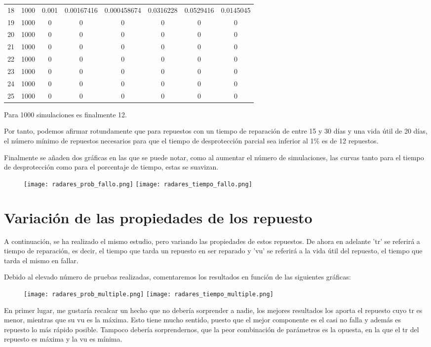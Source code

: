 \begin{table}[h]
{\begin{tabular}{|c|c|c|c|c|c|c|c|}
18 & 1000 & 0.001 & 0.00167416 & 0.000458674 & 0.0316228 & 0.0529416 & 0.0145045 \\
19 & 1000 & 0 & 0 & 0 & 0 & 0 & 0 \\
20 & 1000 & 0 & 0 & 0 & 0 & 0 & 0 \\
21 & 1000 & 0 & 0 & 0 & 0 & 0 & 0 \\
22 & 1000 & 0 & 0 & 0 & 0 & 0 & 0 \\
23 & 1000 & 0 & 0 & 0 & 0 & 0 & 0 \\
24 & 1000 & 0 & 0 & 0 & 0 & 0 & 0 \\
25 & 1000 & 0 & 0 & 0 & 0 & 0 & 0 \\ \hline
\end{tabular}%
}
\end{table}

Para 1000 simulaciones es finalmente 12.

Por tanto, podemos afirmar rotundamente que para repuestos con un tiempo de reparación de entre 15 y 30 días y una vida útil de 20 días, el número mínimo de repuestos necesarios para que el tiempo de desprotección parcial sea inferior al 1\% es de 12 repuestos.

Finalmente se añaden dos gráficas en las que se puede notar, como al aumentar el número de simulaciones, las curvas tanto para el tiempo de desprotección como para el porcentaje de tiempo, estas se suavizan.

\newpage


\begin{figure}[h]
\texttt{[image: radares\_prob\_fallo.png]}
\texttt{[image: radares\_tiempo\_fallo.png]}
\centering
\end{figure}

\newpage

\section{Variación de las  propiedades de los repuesto}
A continuación, se ha realizado el mismo estudio, pero variando las propiedades de estos repuestos. De ahora en adelante 'tr' se referirá a tiempo de reparación, es decir, el tiempo que tarda un repuesto en ser reparado y 'vu' se referirá a la vida útil del repuesto, el tiempo que tarda el mismo en fallar.

Debido al elevado número de pruebas realizadas, comentaremos los resultados en función de las siguientes gráficas:

\begin{figure}[h]
\texttt{[image: radares\_prob\_multiple.png]}
\texttt{[image: radares\_tiempo\_multiple.png]}
\centering
\end{figure}
En primer lugar, me gustaría recalcar un hecho que no debería sorprender a nadie, los mejores resultados los aporta el repuesto cuyo tr es menor, mientras que su vu es la máxima. Esto tiene mucho sentido, puesto que el mejor componente es el casi no falla y además es repuesto lo más rápido posible. Tampoco debería sorprendernos, que la peor combinación de parámetros es la opuesta, en la que el tr del repuesto es máxima y la vu es mínima.

